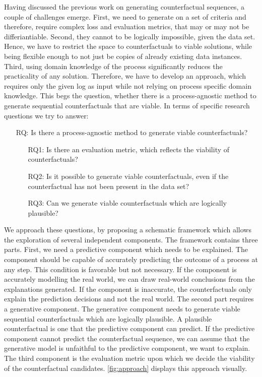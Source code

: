\documentclass[./../../paper.tex]{subfiles}
\begin{document}
Having discussed the previous work on generating counterfactual sequences, a couple of challenges emerge. First, we need to generate on a set of criteria and therefore, require complex loss and evaluation metrics, that may or may not be differiantiable. Second, they cannot to be logically impossible, given the data set. Hence, we have to restrict the space to counterfactuals to viable solutions, while being flexible enough to not just be copies of already existing data instances. Third, using domain knowledge of the process significantly reduces the practicality of any solution. Therefore, we have to develop an approach, which requires only the given log as input while not relying on process specific domain knowledge. This begs the question, whether there is a process-agnostic method to generate sequential counterfactuals that are viable. In terms of specific research questions we try to answer:

\begin{itemize}
    \item[RQ:] Is there a process-agnostic method to generate viable counterfactuals?
    \begin{itemize}
        \item[RQ1:] Is there an evaluation metric, which reflects the viability of counterfactuals?
        \item[RQ2:] Is it possible to generate viable counterfactuals, even if the counterfactual has not been present in the data set?
        \item[RQ3:] Can we generate viable counterfactuals which are logically plausible?  
    \end{itemize}
\end{itemize}

We approach these questions, by proposing a schematic framework which allows the exploration of several independent components. The framework contains three parts. First, we need a predictive component which needs to be explained. The component should be capable of accurately predicting the outcome of a process at any step. This condition is favorable but not necessary. If the component is accurately modelling the real world, we can draw real-world conclusions from the explanations generated. If the component is inaccurate, the counterfactuals only explain the prediction decisions and not the real world. The second part requires a generative component. The generative component needs to generate viable sequential counterfactuals which are logically plausible. A plausible counterfactual is one that the predictive component can predict. If the predictive component cannot predict the counterfactual sequence, we can assume that the generative model is unfaithful to the predictive component, we want to explain. The third component is the evaluation metric upon which we decide the viability of the counterfactual candidates. \autoref{fig:approach} displays this approach visually.   

\end{document}
